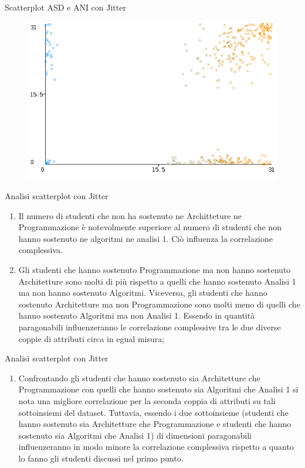 \documentclass{beamer}
\begin{document}
  \begin{frame}{Scatterplot ASD e ANI con Jitter}
    \begin{figure}[bt]
      \begin{center}
        \includegraphics[width=\textwidth]{../img/asdAniWeka.png}
      \end{center}
    \end{figure}
  \end{frame}

  \begin{frame}{Analisi scatterplot con Jitter}
    \begin{enumerate}[-]
      \item Il numero di studenti che non ha sostenuto ne Architteture ne Program\-mazione è notevolmente superiore al numero di studenti che non hanno sostenuto ne algoritmi ne analisi 1. Ciò influenza la correlazione complessiva.
      \item Gli studenti che hanno sostenuto Programmazione ma non hanno sostenuto Architetture sono molti di più rispetto a quelli che hanno sostenuto Analisi 1 ma non hanno sostenuto Algoritmi. Viceversa, gli studenti che hanno sostenuto Architetture ma non Programmazione sono molti meno di quelli che hanno sostenuto Algoritmi ma non Analisi 1. Essendo in quantità paragonabili influenzeranno le correlazione complessive tra le due diverse coppie di attributi circa in egual misura;
    \end{enumerate}
  \end{frame}
  
  \begin{frame}{Analisi scatterplot con Jitter}
    \begin{enumerate}[-]
      \item Confrontando gli studenti che hanno sostenuto sia Architetture che Pro\-grammazione con quelli che hanno sostenuto sia Algoritmi che Analisi 1 si nota una migliore correlazione per la seconda coppia di attributi su tali sottoinsiemi del dataset. Tuttavia, essendo i due sottoinsieme (studenti che hanno sostenuto sia Architetture che Pro\-gramma\-zione e studenti che hanno sostenuto sia Algoritmi che Analisi 1) di dimensioni paragonabili influenzeranno in modo minore la corre\-lazione complessiva rispetto a quanto lo fanno gli studenti discussi nel primo punto.
    \end{enumerate}
  \end{frame}
\end{document}
